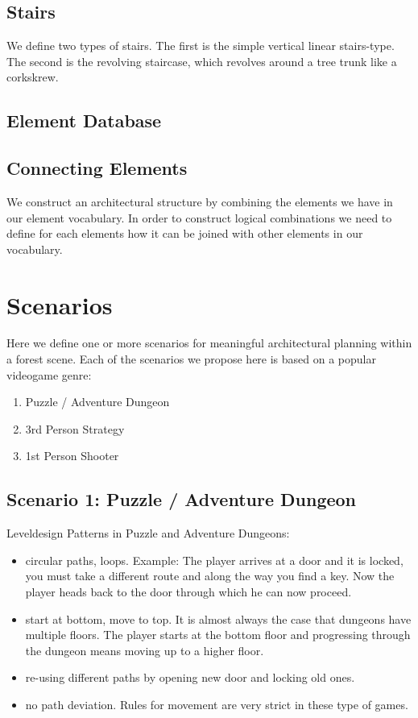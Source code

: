 \subsection{Stairs}
\label{sec:stairs}
  
We define two types of stairs. The first is the simple vertical linear stairs-type. The second is the revolving staircase, which revolves around a tree trunk like a corkskrew. 


\subsection{Element Database}


\subsection{Connecting Elements} 

We construct an architectural structure by combining the elements we have in our element vocabulary.
In order to construct logical combinations we need to define for each elements how it can be joined with other elements
in our vocabulary.

 
\section{Scenarios}
\label{sec:scenarios}

Here we define one or more scenarios for meaningful architectural planning within a forest scene. Each of the scenarios we propose here is based on a popular videogame genre: 

\begin{enumerate}
\item Puzzle / Adventure Dungeon
\item 3rd Person Strategy 
\item 1st Person Shooter
\end{enumerate} 

\subsection{Scenario 1: Puzzle / Adventure Dungeon}
Leveldesign Patterns in Puzzle and Adventure Dungeons:

\begin{itemize}
\item circular paths, loops. Example: The player arrives at a door and it is locked, you must take a different route and along the way you find a key. Now the player heads back to the door through which he can now proceed.  
\item start at bottom, move to top. It is almost always the case that dungeons have multiple floors. The player starts at the bottom floor and progressing through the dungeon means moving up to a higher floor.      
\item re-using different paths by opening new door and locking old ones.    
\item no path deviation. Rules for movement are very strict in these type of games.

\end{itemize}

